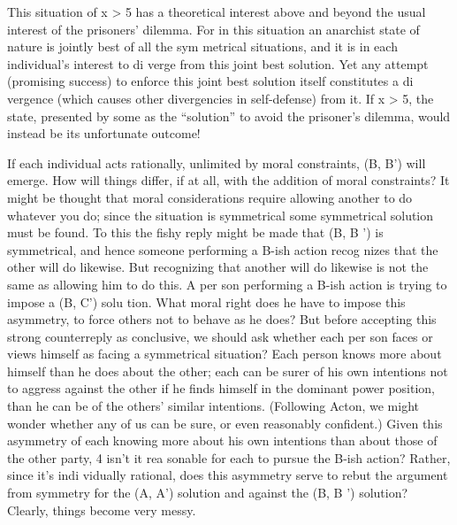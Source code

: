 \documentclass[11pt,openany]{book}
\begin{document}
This situation of x > 5 has a theoretical interest above and beyond the usual interest of the prisoners' dilemma. For in this situation an anarchist state of nature is jointly best of all the sym metrical situations, and it is in each individual's interest to di verge from this joint best solution. Yet any attempt (promising success) to enforce this joint best solution itself constitutes a di vergence (which causes other divergencies in self-defense) from it. If x > 5, the state, presented by some as the ``solution'' to avoid the prisoner's dilemma, would instead be its unfortunate outcome! 

If each individual acts rationally, unlimited by moral constraints, (B, B') will emerge. How will things differ, if at all, with the addition of moral constraints? It might be thought that moral considerations require allowing another to do whatever you do; since the situation is symmetrical some symmetrical solution must be found. To this the fishy reply might be made that (B, B ') is symmetrical, and hence someone performing a B-ish action recog nizes that the other will do likewise. But recognizing that another will do likewise is not the same as allowing him to do this. A per son performing a B-ish action is trying to impose a (B, C') solu tion. What moral right does he have to impose this asymmetry, to force others not to behave as he does? But before accepting this strong counterreply as conclusive, we should ask whether each per son faces or views himself as facing a symmetrical situation? Each person knows more about himself than he does about the other; each can be surer of his own intentions not to aggress against the other if he finds himself in the dominant power position, than he can be of the others' similar intentions. (Following Acton, we might wonder whether any of us can be sure, or even reasonably confident.) Given this asymmetry of each knowing more about his own intentions than about those of the other party, 4 isn't it rea sonable for each to pursue the B-ish action? Rather, since it's indi vidually rational, does this asymmetry serve to rebut the argument from symmetry for the (A, A') solution and against the (B, B ') solution? Clearly, things become very messy. 
\end{document}
